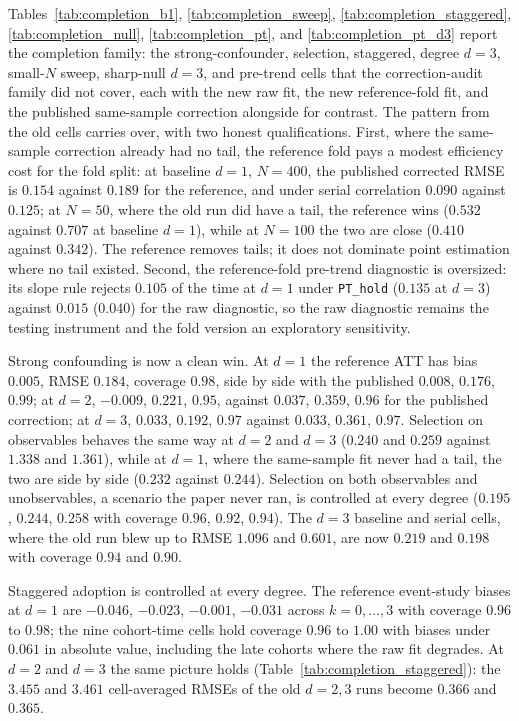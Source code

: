 \documentclass[11pt]{article}
\begin{document}
Tables~\ref{tab:completion_b1}, \ref{tab:completion_sweep},
\ref{tab:completion_staggered}, \ref{tab:completion_null},
\ref{tab:completion_pt}, and \ref{tab:completion_pt_d3} report the completion
family: the strong-confounder, selection, staggered, degree $d=3$, small-$N$
sweep, sharp-null $d=3$, and pre-trend cells that the correction-audit family
did not cover, each with the new raw fit, the new reference-fold fit, and the
published same-sample correction alongside for contrast. The pattern from the
old cells carries over, with two honest qualifications. First, where the
same-sample correction already had no tail, the reference fold pays a modest
efficiency cost for the fold split: at baseline $d=1$, $N=400$, the published
corrected RMSE is $0.154$ against $0.189$ for the reference, and under serial
correlation $0.090$ against $0.125$; at $N=50$, where the old run did have a
tail, the reference wins ($0.532$ against $0.707$ at baseline $d=1$), while at
$N=100$ the two are close ($0.410$ against $0.342$). The reference
removes tails; it does not dominate point estimation where no tail existed.
Second, the reference-fold pre-trend diagnostic is oversized:
its slope rule rejects $0.105$ of the time at $d=1$ under \texttt{PT\_hold}
($0.135$ at $d=3$) against $0.015$ ($0.040$) for the raw diagnostic, so the raw
diagnostic remains the testing instrument and the fold version an exploratory
sensitivity.

Strong confounding is now a clean win. At $d=1$ the reference ATT has bias
$0.005$, RMSE $0.184$, coverage $0.98$, side by side with the published
$0.008$, $0.176$, $0.99$; at $d=2$, $-0.009$, $0.221$, $0.95$,
against $0.037$, $0.359$, $0.96$ for the published correction; at $d=3$,
$0.033$, $0.192$, $0.97$ against $0.033$, $0.361$, $0.97$. Selection on
observables behaves the same way at $d=2$ and $d=3$ ($0.240$ and $0.259$
against $1.338$ and $1.361$), while at $d=1$, where the same-sample fit never
had a tail, the two are side by side ($0.232$ against $0.244$). Selection on
both observables and unobservables, a scenario the paper never ran, is
controlled at every degree ($0.195$, $0.244$, $0.258$ with coverage $0.96$,
$0.92$, $0.94$). The $d=3$ baseline and serial cells, where the old run blew up
to RMSE $1.096$ and $0.601$, are now $0.219$ and $0.198$ with coverage $0.94$
and $0.90$.

Staggered adoption is controlled at every degree. The reference event-study
biases at $d=1$ are $-0.046$, $-0.023$, $-0.001$, $-0.031$ across $k=0,\dots,3$
with coverage $0.96$ to $0.98$; the nine cohort-time cells hold coverage $0.96$
to $1.00$ with biases under $0.061$ in absolute value, including the late
cohorts where the raw fit degrades. At $d=2$ and $d=3$ the same picture holds
(Table~\ref{tab:completion_staggered}): the $3.455$ and $3.461$ cell-averaged
RMSEs of the old $d=2,3$ runs become $0.366$ and $0.365$.
\end{document}
